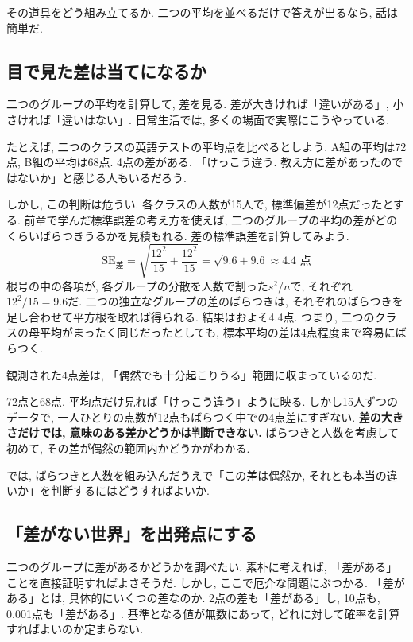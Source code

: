     その道具をどう組み立てるか.
    二つの平均を並べるだけで答えが出るなら, 話は簡単だ.


  \subsection{目で見た差は当てになるか}

    二つのグループの平均を計算して, 差を見る.
    差が大きければ「違いがある」, 小さければ「違いはない」.
    日常生活では, 多くの場面で実際にこうやっている.

    たとえば, 二つのクラスの英語テストの平均点を比べるとしよう.
    A組の平均は72点, B組の平均は68点.
    4点の差がある.
    「けっこう違う. 教え方に差があったのではないか」と感じる人もいるだろう.

    しかし, この判断は危うい.
    各クラスの人数が15人で, 標準偏差が12点だったとする.
    前章で学んだ標準誤差の考え方を使えば, 二つのグループの平均の差がどのくらいばらつきうるかを見積もれる.
    差の標準誤差を計算してみよう.
    \[
      \mathrm{SE}_{\text{差}} = \sqrt{\frac{12^2}{15} + \frac{12^2}{15}} = \sqrt{9.6 + 9.6} \approx 4.4 \text{ 点}
    \]
    根号の中の各項が, 各グループの分散を人数で割った$s^2 / n$で, それぞれ$12^2 / 15 = 9.6$だ.
    二つの独立なグループの差のばらつきは, それぞれのばらつきを足し合わせて平方根を取れば得られる.
    結果はおよそ4.4点.
    つまり, 二つのクラスの母平均がまったく同じだったとしても, 標本平均の差は4点程度まで容易にばらつく.

    観測された4点差は, 「偶然でも十分起こりうる」範囲に収まっているのだ.

    72点と68点. 平均点だけ見れば「けっこう違う」ように映る.
    しかし15人ずつのデータで, 一人ひとりの点数が12点もばらつく中での4点差にすぎない.
    \textbf{差の大きさだけでは, 意味のある差かどうかは判断できない.}
    ばらつきと人数を考慮して初めて, その差が偶然の範囲内かどうかがわかる.

    では, ばらつきと人数を組み込んだうえで「この差は偶然か, それとも本当の違いか」を判断するにはどうすればよいか.


  \subsection{「差がない世界」を出発点にする}

    二つのグループに差があるかどうかを調べたい.
    素朴に考えれば, 「差がある」ことを直接証明すればよさそうだ.
    しかし, ここで厄介な問題にぶつかる.
    「差がある」とは, 具体的にいくつの差なのか.
    2点の差も「差がある」し, 10点も, 0.001点も「差がある」.
    基準となる値が無数にあって, どれに対して確率を計算すればよいのか定まらない.

